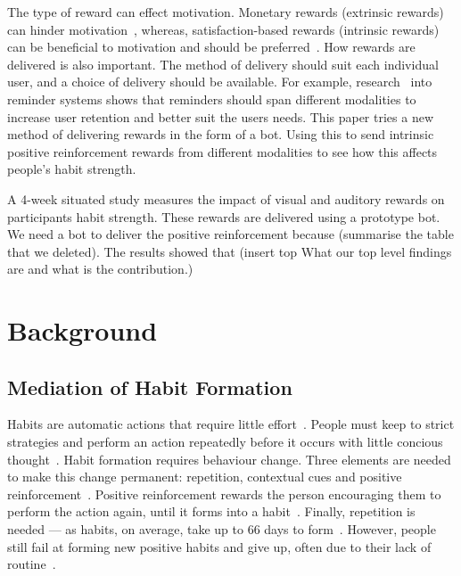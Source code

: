 \documentclass{scaffold/sigchi}
\begin{document}
The type of reward can effect motivation. Monetary rewards (extrinsic rewards) can hinder motivation~\cite{article_meta_analytic_review_intrinsic_motivation}, whereas, satisfaction-based rewards (intrinsic rewards) can be beneficial to motivation and should be preferred~\cite{article_meta_analytic_review_intrinsic_motivation}.
How rewards are delivered is also important. The method of delivery should suit each individual user, and a choice of delivery should be available. For example, research~\cite{article_user_centred_multimodal_reminders} into reminder systems shows that reminders should span different modalities to increase user retention and better suit the users needs.
This paper tries a new method of delivering rewards in the form of a bot. Using this to send intrinsic positive reinforcement rewards from different modalities to see how this affects people's habit strength.

A 4-week situated study measures the impact of visual and auditory rewards on participants habit strength. These rewards are delivered using a prototype bot. We need a bot to deliver the positive reinforcement because (summarise the table that we deleted). The results showed that (insert top What our top level findings are and what is the contribution.)


\section{Background}
\subsection{Mediation of Habit Formation}
Habits are automatic actions that require little effort~\cite{article_the_habitual_consumer}. People must keep to strict strategies and perform an action repeatedly before it occurs with little concious thought~\cite{article_promoting_habit_formation}. Habit formation requires behaviour change. Three elements are needed to make this change permanent: repetition, contextual cues and positive reinforcement~\cite{article_experiences_of_habit_formation}. Positive reinforcement rewards the person encouraging them to perform the action again, until it forms into a habit~\cite{}. Finally, repetition is needed --- as habits, on average, take up to 66 days to form~\cite{article_how_habits_formed_modelling_habit_formation}.
However, people still fail at forming new positive habits and give up, often due to their lack of routine~\cite{article_promoting_habit_formation, article_the_habitual_consumer}.
\end{document}
